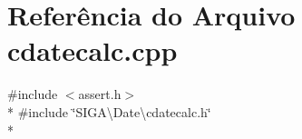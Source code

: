 \section{Referência do Arquivo cdatecalc.\+cpp}
\label{cdatecalc_8cpp}
{\ttfamily \#include $<$assert.\+h$>$}\\*
{\ttfamily \#include \char`\"{}S\+I\+G\+A\textbackslash{}\+Date\textbackslash{}cdatecalc.\+h\char`\"{}}\\*
